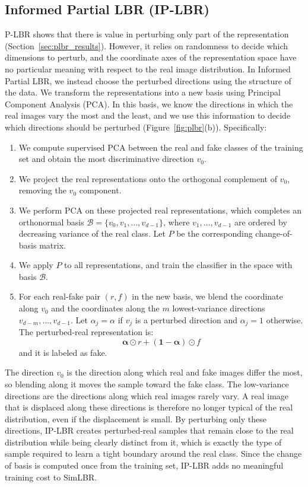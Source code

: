 \subsection{Informed Partial LBR (IP-LBR)}
P-LBR shows that there is value in perturbing only part of the representation (Section~\ref{sec:plbr_results}). However, it relies on randomness to decide which dimensions to perturb, and the coordinate axes of the representation space have no particular meaning with respect to the real image distribution. In Informed Partial LBR, we instead choose the perturbed directions using the structure of the data. We transform the representations into a new basis using Principal Component Analysis (PCA). In this basis, we know the directions in which the real images vary the most and the least, and we use this information to decide which directions should be perturbed (Figure~\ref{fig:plbr}(b)). Specifically:
\begin{enumerate}
    \item We compute supervised PCA between the real and fake classes of the training set and obtain the most discriminative direction $v_0$.
    \item We project the real representations onto the orthogonal complement of $v_0$, removing the $v_0$ component.
    \item We perform PCA on these projected real representations, which completes an orthonormal basis $\mathcal{B} = \{v_0, v_1, \ldots, v_{d-1}\}$, where $v_1, \ldots, v_{d-1}$ are ordered by decreasing variance of the real class. Let $P$ be the corresponding change-of-basis matrix.
    \item We apply $P$ to all representations, and train the classifier in the space with basis $\mathcal{B}$.
    \item For each real-fake pair $(r, f)$ in the new basis, we blend the coordinate along $v_0$ and the coordinates along the $m$ lowest-variance directions $v_{d-m}, \ldots, v_{d-1}$. Let $\alpha_j = \alpha$ if $v_j$ is a perturbed direction and $\alpha_j = 1$ otherwise. The perturbed-real representation is:
    \begin{equation}
    \boldsymbol{\alpha} \odot r + (\mathbf{1} - \boldsymbol{\alpha}) \odot f
    \label{eq:iplbr}
    \end{equation}
    and it is labeled as fake.
\end{enumerate}
The direction $v_0$ is the direction along which real and fake images differ the most, so blending along it moves the sample toward the fake class. The low-variance directions are the directions along which real images rarely vary. A real image that is displaced along these directions is therefore no longer typical of the real distribution, even if the displacement is small. By perturbing only these directions, IP-LBR creates perturbed-real samples that remain close to the real distribution while being clearly distinct from it, which is exactly the type of sample required to learn a tight boundary around the real class. Since the change of basis is computed once from the training set, IP-LBR adds no meaningful training cost to SimLBR. 

